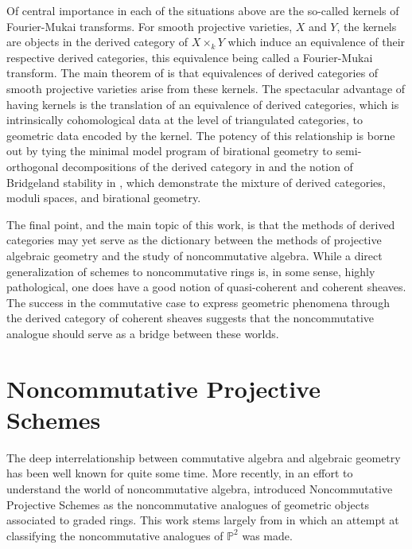Of central importance in each of the situations above are the so-called kernels of Fourier-Mukai transforms.
For smooth projective varieties, \(X\) and \(Y\), the kernels are objects in the derived category of \(X \times_k Y\) which induce an equivalence of their respective derived categories, this equivalence being called a Fourier-Mukai transform.
The main theorem of \textcite{Orlov97} is that equivalences of derived categories of smooth projective varieties arise from these kernels.
The spectacular advantage of having kernels is the translation of an equivalence of derived categories, which is intrinsically cohomological data at the level of triangulated categories, to geometric data encoded by the kernel.
The potency of this relationship is borne out by tying the minimal model program of birational geometry to semi-orthogonal decompositions of the derived category in \textcite{Bridgeland02,Kawamata02} and the notion of Bridgeland stability in \textcite{Bridgeland07, ABCH13, Bayer-Macri14a, Bayer-Macri14b}, which demonstrate the mixture of derived categories, moduli spaces, and birational geometry.

The final point, and the main topic of this work, is that the methods of derived categories may yet serve as the dictionary between the methods of projective algebraic geometry and the study of noncommutative algebra.
While a direct generalization of schemes to noncommutative rings is, in some sense, highly pathological, one does have a good notion of quasi-coherent and coherent sheaves.
The success in the commutative case to express geometric phenomena through the derived category of coherent sheaves suggests that the noncommutative analogue should serve as a bridge between these worlds.

\section*{Noncommutative Projective Schemes}
The deep interrelationship between commutative algebra and algebraic geometry has been well known for quite some time.
More recently, in an effort to understand the world of noncommutative algebra, \textcite{AZ94} introduced Noncommutative Projective Schemes as the noncommutative analogues of geometric objects associated to graded rings.
This work stems largely from \textcite{AS87} in which an attempt at classifying the noncommutative analogues of \(\mathbb{P}^2\) was made.

